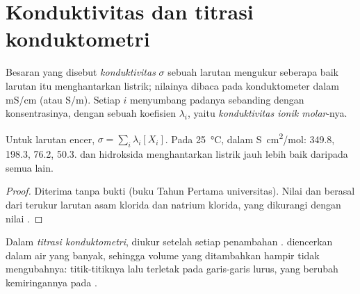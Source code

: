 \section{Konduktivitas dan titrasi konduktometri}

\begin{definition}\label{def:g12:ph-conductivity-titrations:conductivity}
Besaran yang disebut \emph{konduktivitas} $\sigma$ sebuah
larutan mengukur seberapa baik larutan itu menghantarkan listrik;
nilainya dibaca pada konduktometer dalam \si{mS/cm} (atau \si{S/m}).
Setiap  $i$ menyumbang padanya sebanding dengan konsentrasinya,
dengan sebuah koefisien $\lambda_i$, yaitu
\emph{konduktivitas ionik molar}-nya.
\end{definition}

\begin{proposition}\label{prop:g12:ph-conductivity-titrations:kohlrausch}
Untuk larutan encer, $\sigma = \sum_i \lambda_i [X_i]$. Pada
\qty{25}{\celsius}, dalam \si{S.cm^2/mol}:  349.8, 
198.3,  76.2,  50.3.  dan  hidroksida
menghantarkan listrik jauh lebih baik daripada semua  lain.
\end{proposition}

\begin{proof}
Diterima tanpa bukti (buku Tahun Pertama universitas). Nilai 
dan  berasal dari  terukur larutan asam klorida dan
natrium klorida, yang dikurangi dengan nilai .
\end{proof}

\begin{definition}\label{def:g12:ph-conductivity-titrations:conductimetric}
Dalam \emph{titrasi konduktometri},
 diukur setelah setiap penambahan .  diencerkan dalam air yang banyak, sehingga volume yang
ditambahkan hampir tidak mengubahnya: titik-titiknya lalu terletak pada
garis-garis lurus, yang berubah kemiringannya pada .
\end{definition}

